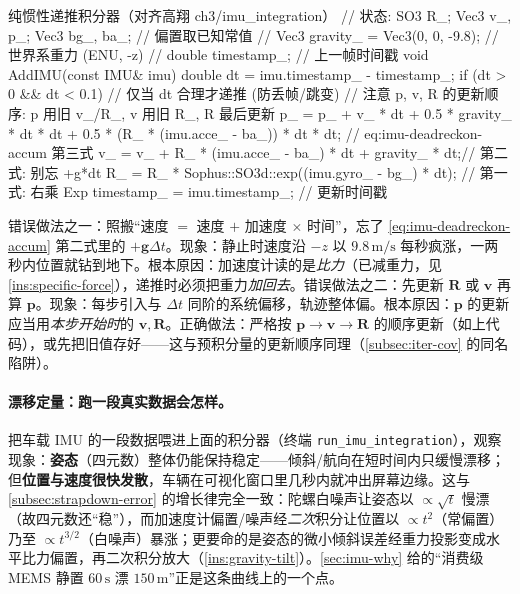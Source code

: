 \begin{codebox}[C++]{纯惯性递推积分器（对齐高翔 ch3/imu\_integration）}
// 状态: SO3 R_; Vec3 v_, p_; Vec3 bg_, ba_;        // 偏置取已知常值
// Vec3 gravity_ = Vec3(0, 0, -9.8);                // 世界系重力 (ENU, -z)
// double timestamp_;                               // 上一帧时间戳
void AddIMU(const IMU& imu) {
  double dt = imu.timestamp_ - timestamp_;
  if (dt > 0 && dt < 0.1) {                         // 仅当 dt 合理才递推 (防丢帧/跳变)
    // 注意 p, v, R 的更新顺序: p 用旧 v_/R_, v 用旧 R_, R 最后更新
    p_ = p_ + v_ * dt + 0.5 * gravity_ * dt * dt
            + 0.5 * (R_ * (imu.acce_ - ba_)) * dt * dt;   // eq:imu-deadreckon-accum 第三式
    v_ = v_ + R_ * (imu.acce_ - ba_) * dt + gravity_ * dt;// 第二式: 别忘 +g*dt
    R_ = R_ * Sophus::SO3d::exp((imu.gyro_ - bg_) * dt);  // 第一式: 右乘 Exp
  }
  timestamp_ = imu.timestamp_;                      // 更新时间戳
}
\end{codebox}

\begin{pitfall}
错误做法之一：照搬“速度 $=$ 速度 $+$ 加速度 $\times$ 时间”，忘了 \cref{eq:imu-deadreckon-accum} 第二式里的 $+\mathbf g\Delta t$。现象：静止时速度沿 $-z$ 以 $9.8\,\mathrm{m/s}$ 每秒疯涨，一两秒内位置就钻到地下。根本原因：加速度计读的是\emph{比力}（已减重力，见 \cref{ins:specific-force}），递推时必须把重力\emph{加回去}。错误做法之二：先更新 $\mathbf R$ 或 $\mathbf v$ 再算 $\mathbf p$。现象：每步引入与 $\Delta t$ 同阶的系统偏移，轨迹整体偏。根本原因：$\mathbf p$ 的更新应当用\emph{本步开始时}的 $\mathbf v,\mathbf R$。正确做法：严格按 $\mathbf p\to\mathbf v\to\mathbf R$ 的顺序更新（如上代码），或先把旧值存好——这与预积分量的更新顺序同理（\cref{subsec:iter-cov} 的同名陷阱）。
\end{pitfall}

\paragraph{漂移定量：跑一段真实数据会怎样。}
把车载 IMU 的一段数据喂进上面的积分器（终端 \texttt{run\_imu\_integration}），观察现象\cite{gao2023slamad}：\textbf{姿态}（四元数）整体仍能保持稳定——倾斜/航向在短时间内只缓慢漂移；但\textbf{位置与速度很快发散}，车辆在可视化窗口里几秒内就冲出屏幕边缘。这与 \cref{subsec:strapdown-error} 的增长律完全一致：陀螺白噪声让姿态以 $\propto\sqrt t$ 慢漂（故四元数还“稳”），而加速度计偏置/噪声经\emph{二次}积分让位置以 $\propto t^2$（常偏置）乃至 $\propto t^{3/2}$（白噪声）暴涨；更要命的是姿态的微小倾斜误差经重力投影变成水平比力偏置，再二次积分放大（\cref{ins:gravity-tilt}）。\cref{sec:imu-why} 给的“消费级 MEMS 静置 $60\,\mathrm s$ 漂 $150\,\mathrm m$”正是这条曲线上的一个点。

